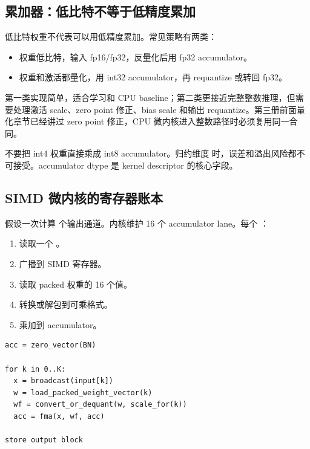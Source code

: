 \subsection{累加器：低比特不等于低精度累加}

低比特权重不代表可以用低精度累加。常见策略有两类：

\begin{itemize}
  \item 权重低比特，输入 fp16/fp32，反量化后用 fp32 accumulator。
  \item 权重和激活都量化，用 int32 accumulator，再 requantize 或转回 fp32。
\end{itemize}

第一类实现简单，适合学习和 CPU baseline；第二类更接近完整整数推理，但需要处理激活 scale、zero point 修正、bias scale 和输出 requantize。第三册前面量化章节已经讲过 zero point 修正，CPU 微内核进入整数路径时必须复用同一合同。

\begin{warningbox}
不要把 int4 权重直接乘成 int8 accumulator。归约维度  时，误差和溢出风险都不可接受。accumulator dtype 是 kernel descriptor 的核心字段。
\end{warningbox}

\subsection{SIMD 微内核的寄存器账本}

假设一次计算  个输出通道。内核维护 16 个 accumulator lane。每个 ：

\begin{enumerate}
  \item 读取一个 。
  \item 广播到 SIMD 寄存器。
  \item 读取 packed 权重的 16 个值。
  \item 转换或解包到可乘格式。
  \item 乘加到 accumulator。
\end{enumerate}

\begin{lstlisting}[numbers=none,caption={抽象 SIMD GEMV 微内核}]
acc = zero_vector(BN)

for k in 0..K:
  x = broadcast(input[k])
  w = load_packed_weight_vector(k)
  wf = convert_or_dequant(w, scale_for(k))
  acc = fma(x, wf, acc)

store output block
\end{lstlisting}


